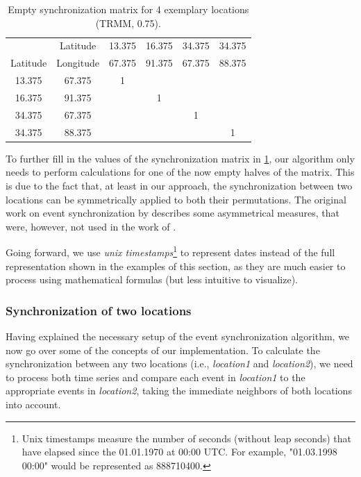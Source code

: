 \begin{table}[h]
  \centering
  \begin{tabular}{ |cc|cccc| }
    \hline
     & Latitude & 13.375 & 16.375 & 34.375 & 34.375 \\
    Latitude & Longitude & 67.375 & 91.375 & 67.375 & 88.375 \\
    \hline
    13.375 & 67.375 & 1 &   &   &   \\
    16.375 & 91.375 &   & 1 &   &   \\
    34.375 & 67.375 &   &   & 1 &   \\
    34.375 & 88.375 &   &   &   & 1 \\
    \hline
  \end{tabular}
  \caption{Empty synchronization matrix for 4 exemplary locations (TRMM, 0.75\degree).}
  \label{tab:example_empty_sync}
\end{table}

To further fill in the values of the synchronization matrix in \cref{tab:example_empty_sync}, our algorithm only needs to perform calculations for one of the now empty halves of the matrix. This is due to the fact that, at least in our approach, the synchronization between two locations can be symmetrically applied to both their permutations. The original work on event synchronization by \citet{QuianQuiroga.2002} describes some asymmetrical measures, that were, however, not used in the work of \citet{Stolbova.2015}.

Going forward, we use \textit{unix timestamps}\footnote{Unix timestamps measure the number of seconds (without leap seconds) that have elapsed since the 01.01.1970 at 00:00 UTC. For example, "01.03.1998 00:00" would be represented as 888710400.} to represent dates instead of the full representation shown in the examples of this section, as they are much easier to process using mathematical formulas (but less intuitive to visualize).

\pagebreak
\subsubsection{Synchronization of two locations}
Having explained the necessary setup of the event synchronization algorithm, we now go over some of the concepts of our implementation. To calculate the synchronization between any two locations (i.e., \textit{location1} and \textit{location2}), we need to process both time series and compare each event in \textit{location1} to the appropriate events in \textit{location2}, taking the immediate neighbors of both locations into account.

